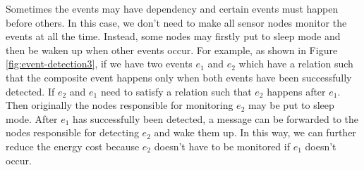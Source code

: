 Sometimes the events may have dependency and certain events must happen before others. In this case, we don't need to make all sensor nodes monitor the events at all the time. Instead, some nodes may firstly put to sleep mode and then be waken up when other events occur. For example, as shown in Figure \ref{fig:event-detection3}, if we have two events \(e_1\) and \(e_2\) which have a relation such that the composite event happens only when both events have been successfully detected. If \(e_2\) and \(e_1\) need to satisfy a relation such that \(e_2\) happens after \(e_1\). Then originally the nodes responsible for monitoring \(e_2\) may be put to sleep mode. After \(e_1\) has successfully been detected, a message can be forwarded to the nodes responsible for detecting \(e_2\) and wake them up. In this way, we can further reduce the energy cost because \(e_2\) doesn't have to be monitored if \(e_1\) doesn't occur.
